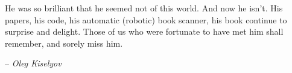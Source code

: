 He was so brilliant that he seemed not of this world. And now he
isn't.  His papers, his code, his automatic (robotic) book scanner,
his book continue to surprise and delight.  Those of us who were
fortunate to have met him shall remember, and sorely miss him.

\begin{flushright}
  -- \textit{Oleg Kiselyov}
\end{flushright}

\newpage

